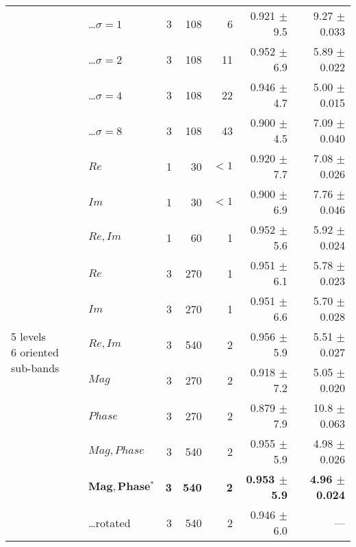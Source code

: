 \begin{tabularx}{\linewidth}{p{3.1cm} p{3cm} r r r r r}
        & \hspace{2mm} \ldots ${\sigma = 1}$
                                    & 3 & 108   &  6    & 0.921 $\pm$ 9.5   & 9.27 $\pm$ 0.033 \\
        & \hspace{2mm} \ldots ${\sigma = 2}$
                                    & 3 & 108   & 11    & 0.952 $\pm$ 6.9   & 5.89 $\pm$ 0.022 \\
        & \hspace{2mm} \ldots ${\sigma = 4}$
                                    & 3 & 108   & 22    & 0.946 $\pm$ 4.7   & 5.00 $\pm$ 0.015 \\
        & \hspace{2mm} \ldots ${\sigma = 8}$
                                    & 3 & 108   & 43    & 0.900 $\pm$ 4.5   & 7.09 $\pm$ 0.040 \\

\midrule
\multirow{14}{3.1cm}{\centering
    \textbf{\dtcwt{}}
    \newline 5 levels
    \newline 6 oriented sub-bands }
        & $Re$                      & 1 &  30   &${<}1$ & 0.920 $\pm$ 7.7   & 7.08 $\pm$ 0.026 \\
        & $Im$                      & 1 &  30   &${<}1$ & 0.900 $\pm$ 6.9   & 7.76 $\pm$ 0.046 \\
        & $Re,Im$                   & 1 &  60   &  1    & 0.952 $\pm$ 5.6   & 5.92 $\pm$ 0.024 \\
        & $Re$                      & 3 & 270   &  1    & 0.951 $\pm$ 6.1   & 5.78 $\pm$ 0.023 \\
        & $Im$                      & 3 & 270   &  1    & 0.951 $\pm$ 6.6   & 5.70 $\pm$ 0.028 \\
        & $Re,Im$                   & 3 & 540   &  2    & 0.956 $\pm$ 5.9   & 5.51 $\pm$ 0.027 \\
        & $Mag$                     & 3 & 270   &  2    & 0.918 $\pm$ 7.2   & 5.05 $\pm$ 0.020 \\
        & $Phase$                   & 3 & 270   &  2    & 0.879 $\pm$ 7.9   & 10.8 $\pm$ 0.063 \\
        & $Mag,Phase$               & 3 & 540   &  2    & 0.955 $\pm$ 5.9   & 4.98 $\pm$ 0.026 \\
        & $\mathbf{Mag, Phase{^*}}$ & \textbf{3} & \textbf{540}   & \textbf{2}    & \textbf{0.953 $\pm$ 5.9}   & \textbf{4.96 $\pm$ 0.024} \\
        & \hspace{2mm} \ldots rotated
                                    & 3 & 540   &  2    & 0.946 $\pm$ 6.0   & --- \\


\end{tabularx}

